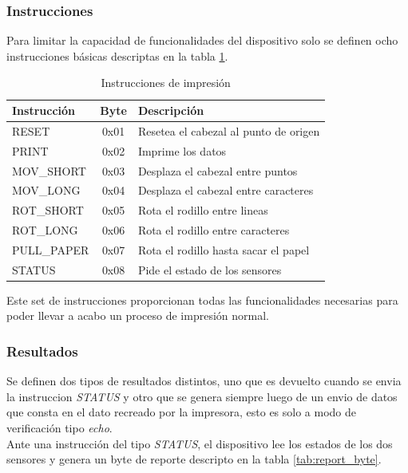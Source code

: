 \subsubsection{Instrucciones}
%
Para limitar la capacidad de funcionalidades del dispositivo solo se
definen ocho instrucciones b\'asicas descriptas en la tabla
\ref{tab:instructions_set}.

\begin{table}[ht]
\centering
\begin{tabular}{|l|c|l|} 												\hline
\rowcolor[gray]{.9}
Instrucci\'on & Byte & Descripci\'on 								\\ 	\hline
RESET 		&	0x01	&	Resetea el cabezal	al punto de origen	\\	\hline
PRINT 		&	0x02	&	Imprime los datos						\\	\hline
MOV\_SHORT 	&  	0x03	&	Desplaza el cabezal entre puntos		\\	\hline
MOV\_LONG  	&  	0x04	&	Desplaza el cabezal entre caracteres	\\	\hline
ROT\_SHORT 	&	0x05	&	Rota el rodillo entre lineas			\\	\hline
ROT\_LONG   &	0x06	&	Rota el rodillo entre caracteres		\\	\hline
PULL\_PAPER	&	0x07	&	Rota el rodillo hasta sacar el papel	\\	\hline
STATUS		&	0x08	&	Pide el estado de los sensores			\\	\hline
\end{tabular}
\caption{Instrucciones de impresi\'on} 
\label{tab:instructions_set}
\end{table}

Este set de instrucciones proporcionan todas las funcionalidades necesarias
para poder llevar a acabo un proceso de impresi\'on normal.

\subsubsection{Resultados}
%
Se definen dos tipos de resultados distintos, uno que es devuelto cuando se
envia la instruccion \emph{STATUS} y otro que se genera siempre luego de un
envio de datos que consta en el dato recreado por la impresora, esto es solo a
modo de verificaci\'on tipo \emph{echo}.\\

Ante una instrucci\'on del tipo \emph{STATUS}, el dispositivo lee los estados
de los dos sensores y genera un byte de reporte descripto en la tabla
\ref{tab:report_byte}.



